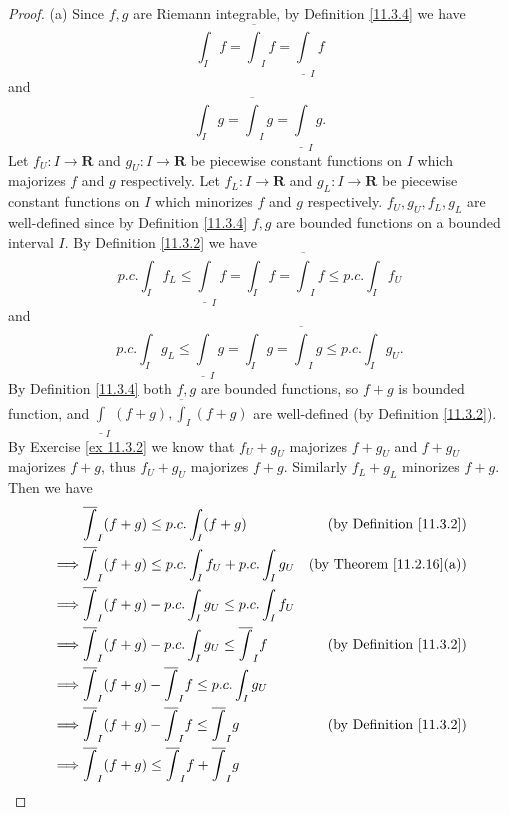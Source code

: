 \begin{proof}{(a)}
    Since \(f, g\) are Riemann integrable, by Definition \ref{11.3.4} we have
    \[
        \int_I f = \overline{\int}_I f = \underline{\int}_I f
    \]
    and
    \[
        \int_I g = \overline{\int}_I g = \underline{\int}_I g.
    \]
    Let \(f_U : I \to \mathbf{R}\) and \(g_U : I \to \mathbf{R}\) be piecewise constant functions on \(I\) which majorizes \(f\) and \(g\) respectively.
    Let \(f_L : I \to \mathbf{R}\) and \(g_L : I \to \mathbf{R}\) be piecewise constant functions on \(I\) which minorizes \(f\) and \(g\) respectively.
    \(f_U, g_U, f_L, g_L\) are well-defined since by Definition \ref{11.3.4} \(f, g\) are bounded functions on a bounded interval \(I\).
    By Definition \ref{11.3.2} we have
    \[
        p.c. \int_I f_L \leq \underline{\int}_I f = \int_I f = \overline{\int}_I f \leq p.c. \int_I f_U
    \]
    and
    \[
        p.c. \int_I g_L \leq \underline{\int}_I g = \int_I g = \overline{\int}_I g \leq p.c. \int_I g_U.
    \]
    By Definition \ref{11.3.4} both \(f, g\) are bounded functions, so \(f + g\) is bounded function, and \(\underline{\int}_I (f + g), \overline{\int}_I (f + g)\) are well-defined (by Definition \ref{11.3.2}).
    By Exercise \ref{ex 11.3.2} we know that \(f_U + g_U\) majorizes \(f + g_U\) and \(f + g_U\) majorizes \(f + g\), thus \(f_U + g_U\) majorizes \(f + g\).
    Similarly \(f_L + g_L\) minorizes \(f + g\).
    Then we have
    \begin{align*}
                 & \overline{\int}_I (f + g) \leq p.c. \int_I (f + g)                       & \text{(by Definition \ref{11.3.2})}  \\
        \implies & \overline{\int}_I (f + g) \leq p.c. \int_I f_U + p.c. \int_I g_U         & \text{(by Theorem \ref{11.2.16}(a))} \\
        \implies & \overline{\int}_I (f + g) - p.c. \int_I g_U \leq p.c. \int_I f_U                                                \\
        \implies & \overline{\int}_I (f + g) - p.c. \int_I g_U \leq \overline{\int}_I f     & \text{(by Definition \ref{11.3.2})}  \\
        \implies & \overline{\int}_I (f + g) - \overline{\int}_I f \leq p.c. \int_I g_U                                            \\
        \implies & \overline{\int}_I (f + g) - \overline{\int}_I f \leq \overline{\int}_I g & \text{(by Definition \ref{11.3.2})}  \\
        \implies & \overline{\int}_I (f + g) \leq \overline{\int}_I f + \overline{\int}_I g &                                      \\

\end{align*}
\end{proof}
